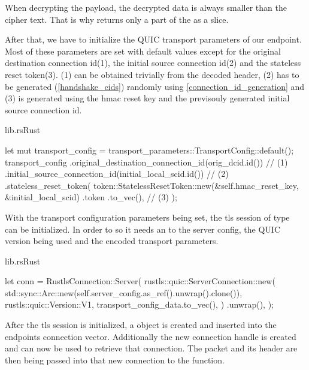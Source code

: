 When decrypting the payload, the decrypted data is always smaller than the cipher text. That is why 
returns only a part of the  as a slice.

After that, we have to initialize the QUIC transport parameters of our endpoint. Most of these parameters are set with default values
except for the original destination connection id(1), the initial source connection id(2) and the stateless reset token(3). (1) can
be obtained trivially from the decoded header, (2) has to be generated (\ref{handshake_cids}) randomly using \ref{connection_id_generation}
and (3) is generated using the hmac reset key and the previsouly generated initial source connection id.

\begin{codeblock}{lib.rs}{Rust}
    \begin{rustcode}
        let mut transport_config = transport_parameters::TransportConfig::default();
        transport_config
            .original_destination_connection_id(orig_dcid.id()) // (1)
            .initial_source_connection_id(initial_local_scid.id()) // (2)
            .stateless_reset_token( 
                token::StatelessResetToken::new(&self.hmac_reset_key, &initial_local_scid)
                    .token
                    .to_vec(), // (3)
            );
    \end{rustcode}
\end{codeblock}

With the transport configuration parameters being set, the tls session of type \\ 
 can be initialized. In order to so it needs an   to the server config,
the QUIC version being used and the encoded transport parameters.

\begin{codeblock}{lib.rs}{Rust}
    \begin{rustcode}
        let conn = RustlsConnection::Server(
            rustls::quic::ServerConnection::new(
                std::sync::Arc::new(self.server_config.as_ref().unwrap().clone()),
                rustls::quic::Version::V1,
                transport_config_data.to_vec(),
            )
            .unwrap(),
        );
    \end{rustcode}
\end{codeblock}
        
After the tls session is initialized, a  object is created and inserted into the endpoints
connection vector. Additionally the new connection handle is created and can now be used to retrieve that connection. 
The packet and its header are then being passed into that new connection to the  function.

